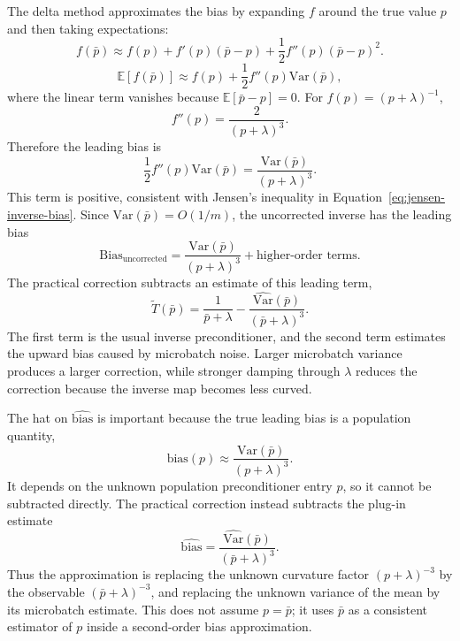 \documentclass{article}
\newcommand{\E}{\mathbb{E}}
\newcommand{\Var}{\mathrm{Var}}
\begin{document}
The delta method approximates the bias by expanding $f$ around the true value $p$ and then taking expectations:
\begin{equation}
    f(\bar p)
    \approx
    f(p)
    +
    f'(p)(\bar p-p)
    +
    \frac{1}{2} f''(p)(\bar p-p)^2.
\end{equation}
\begin{equation}
    \E[f(\bar p)]
    \approx
    f(p)
    +
    \frac{1}{2} f''(p)\Var(\bar p),
\end{equation}
where the linear term vanishes because $\E[\bar p-p]=0$. For $f(p)=(p+\lambda)^{-1}$,
\begin{equation}
    f''(p)=\frac{2}{(p+\lambda)^3}.
\end{equation}
Therefore the leading bias is
\begin{equation}
    \frac{1}{2} f''(p)\Var(\bar p)
    =
    \frac{\Var(\bar p)}{(p+\lambda)^3}.
\end{equation}
This term is positive, consistent with Jensen's inequality in Equation~\eqref{eq:jensen-inverse-bias}. Since $\Var(\bar p)=O(1/m)$, the uncorrected inverse has the leading bias
\begin{equation}
    \mathrm{Bias}_{\mathrm{uncorrected}}
    =
    \frac{\Var(\bar p)}{(p+\lambda)^3}
    +
    \text{higher-order terms}.
\end{equation}
The practical correction subtracts an estimate of this leading term,
\begin{equation}
    \widetilde T(\bar p)
    =
    \frac{1}{\bar p+\lambda}
    -
    \frac{\widehat{\Var}(\bar p)}{(\bar p+\lambda)^3}.
\end{equation}
The first term is the usual inverse preconditioner, and the second term estimates the upward bias caused by microbatch noise. Larger microbatch variance produces a larger correction, while stronger damping through $\lambda$ reduces the correction because the inverse map becomes less curved.

The hat on $\widehat{\mathrm{bias}}$ is important because the true leading bias is a population quantity,
\begin{equation}
    \mathrm{bias}(p)
    \approx
    \frac{\Var(\bar p)}{(p+\lambda)^3}.
\end{equation}
It depends on the unknown population preconditioner entry $p$, so it cannot be subtracted directly. The practical correction instead subtracts the plug-in estimate
\begin{equation}
    \widehat{\mathrm{bias}}
    =
    \frac{\widehat{\Var}(\bar p)}{(\bar p+\lambda)^3}.
\end{equation}
Thus the approximation is replacing the unknown curvature factor $(p+\lambda)^{-3}$ by the observable $(\bar p+\lambda)^{-3}$, and replacing the unknown variance of the mean by its microbatch estimate. This does not assume $p=\bar p$; it uses $\bar p$ as a consistent estimator of $p$ inside a second-order bias approximation.
\end{document}
